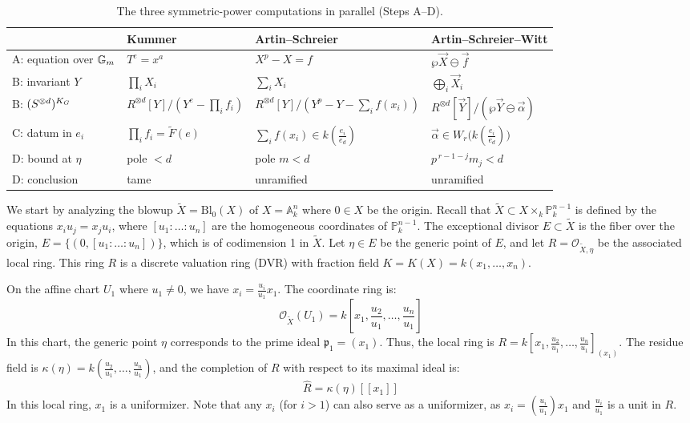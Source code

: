 \begin{table}[h]
\centering\footnotesize
\renewcommand{\arraystretch}{1.4}
\begin{tabular}{@{}l>{\raggedright\arraybackslash}p{3.2cm}>{\raggedright\arraybackslash}p{3.2cm}>{\raggedright\arraybackslash}p{3.5cm}@{}}
\hline
 & \textbf{Kummer} & \textbf{Artin--Schreier} & \textbf{Artin--Schreier--Witt} \\
\hline
A: equation over $\mathbb{G}_m$ & $T^e = x^a$ & $X^p - X = f$ & $\wp \vec X \ominus \vec f$ \\
B: invariant $Y$ & $\prod_i X_i$ & $\sum_i X_i$ & $\bigoplus_i \vec X_i$ \\
B: $(S^{\otimes d})^{K_{G}}$ & $R^{\otimes d}[Y]/(Y^e - \prod_i f_i)$ & $R^{\otimes d}[Y]/(Y^p - Y - \sum_i f(x_i))$ & $R^{\otimes d}[\vec Y]/(\wp \vec Y \ominus \vec\alpha)$ \\
C: datum in $e_i$ & $\prod_i f_i = \tilde F(e)$ & $\sum_i f(x_i) \in k(\tfrac{e_i}{e_d})$ & $\vec\alpha \in W_r\!\big(k(\tfrac{e_i}{e_d})\big)$ \\
D: bound at $\eta$ & pole $< d$ & pole $m < d$ & $p^{\,r-1-j} m_j < d$ \\
D: conclusion & tame & unramified & unramified \\
\hline
\end{tabular}
\caption{The three symmetric-power computations in parallel (Steps A--D).}
\label{table:cyclic_computation_dictionary:reorg}
\end{table}
We start by analyzing the blowup $\tilde{X} = \text{Bl}_0(X)$ of $X = \mathbb{A}_k^n$
where $0 \in X$ be the origin. 
Recall that $\tilde{X} \subset X \times_k \mathbb{P}^{n-1}_k$ is defined by the equations $x_i u_j = x_j u_i$, where $[u_1 : \dots : u_n]$ are the homogeneous coordinates of 
$\mathbb{P}^{n-1}_k$.
The exceptional divisor $E \subset \tilde{X}$ is the fiber over the origin, $E = \{ (0, [u_1 : \dots : u_n]) \}$, which is of codimension 1 in $\tilde{X}$. 
Let $\eta \in E$ be the generic point of $E$, and let $R = \mathcal{O}_{\tilde{X}, \eta}$ be the associated local ring. 
This ring $R$ is a discrete valuation ring (DVR) with fraction field $K = K(X) = k(x_1, \dots, x_n)$.

On the affine chart $U_1$ where $u_1 \neq 0$, we have $x_i = \frac{u_i}{u_1} x_1$. 
The coordinate ring is:$$\mathcal{O}_{\tilde{X}}(U_1) = k\left[x_1, \frac{u_2}{u_1}, \dots, \frac{u_n}{u_1}\right]$$
In this chart, the generic point $\eta$ corresponds to the prime ideal $\mathfrak{p}_1 = (x_1)$. Thus, the local ring is $R = k[x_1, \frac{u_2}{u_1}, \dots, \frac{u_n}{u_1}]_{(x_1)}$. 
The residue field is $\kappa(\eta) = k(\frac{u_2}{u_1}, \dots, \frac{u_n}{u_1})$, and the completion of $R$ with respect to its maximal ideal is:
$$\hat{R} = \kappa(\eta)[[x_1]]$$
In this local ring, $x_1$ is a uniformizer. Note that any $x_i$ (for $i > 1$) can also serve as a uniformizer, 
as $x_i = (\frac{u_i}{u_1}) x_1$ and $\frac{u_i}{u_1}$ is a unit in $R$.


